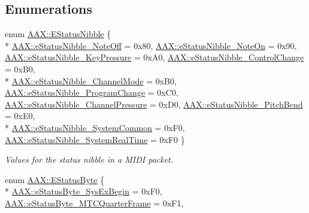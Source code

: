 \subsection*{Enumerations}
\begin{DoxyCompactItemize}
\item 
enum \hyperlink{a00288_a128e460fdb72f04a5d077f77c02b3c30}{A\+A\+X\+::\+E\+Status\+Nibble} \{ \\*
\hyperlink{a00288_a128e460fdb72f04a5d077f77c02b3c30a879656d38da19be8e39951bb7037fdf6}{A\+A\+X\+::e\+Status\+Nibble\+\_\+\+Note\+Off} = 0x80, 
\hyperlink{a00288_a128e460fdb72f04a5d077f77c02b3c30ab269085f7106b0ba07ffaab0b7e6a713}{A\+A\+X\+::e\+Status\+Nibble\+\_\+\+Note\+On} = 0x90, 
\hyperlink{a00288_a128e460fdb72f04a5d077f77c02b3c30ac58c4a1d24d65b2aa83dd8958ab5c79f}{A\+A\+X\+::e\+Status\+Nibble\+\_\+\+Key\+Pressure} = 0x\+A0, 
\hyperlink{a00288_a128e460fdb72f04a5d077f77c02b3c30aad9f788bf727d8a2e29ed267f0c63c54}{A\+A\+X\+::e\+Status\+Nibble\+\_\+\+Control\+Change} = 0x\+B0, 
\\*
\hyperlink{a00288_a128e460fdb72f04a5d077f77c02b3c30acfa2f6c1f419ab8f84b18305cd182c05}{A\+A\+X\+::e\+Status\+Nibble\+\_\+\+Channel\+Mode} = 0x\+B0, 
\hyperlink{a00288_a128e460fdb72f04a5d077f77c02b3c30af1211ef53c1f40ee06aff0a624b42d2f}{A\+A\+X\+::e\+Status\+Nibble\+\_\+\+Program\+Change} = 0x\+C0, 
\hyperlink{a00288_a128e460fdb72f04a5d077f77c02b3c30a2f3c65a49b997078c50d7210a775f06c}{A\+A\+X\+::e\+Status\+Nibble\+\_\+\+Channel\+Pressure} = 0x\+D0, 
\hyperlink{a00288_a128e460fdb72f04a5d077f77c02b3c30a508ff1dbd19ad390f85611922fc81433}{A\+A\+X\+::e\+Status\+Nibble\+\_\+\+Pitch\+Bend} = 0x\+E0, 
\\*
\hyperlink{a00288_a128e460fdb72f04a5d077f77c02b3c30a046a282d622e11711878fcad5b713c8d}{A\+A\+X\+::e\+Status\+Nibble\+\_\+\+System\+Common} = 0x\+F0, 
\hyperlink{a00288_a128e460fdb72f04a5d077f77c02b3c30ab036cdb470fde61d5a397be9a1b036a5}{A\+A\+X\+::e\+Status\+Nibble\+\_\+\+System\+Real\+Time} = 0x\+F0
 \}
\begin{DoxyCompactList}\small\item\em Values for the status nibble in a M\+I\+D\+I packet. \end{DoxyCompactList}\item 
enum \hyperlink{a00288_a007db6cfa461dbbb87e49e2ec52e18b0}{A\+A\+X\+::\+E\+Status\+Byte} \{ \\*
\hyperlink{a00288_a007db6cfa461dbbb87e49e2ec52e18b0afe46f6c375435e0cddbcb9efda89b9ca}{A\+A\+X\+::e\+Status\+Byte\+\_\+\+Sys\+Ex\+Begin} = 0x\+F0, 
\hyperlink{a00288_a007db6cfa461dbbb87e49e2ec52e18b0a05d918c77b03e9be5378d487d6ef56de}{A\+A\+X\+::e\+Status\+Byte\+\_\+\+M\+T\+C\+Quarter\+Frame} = 0x\+F1, 

\end{DoxyCompactItemize}

